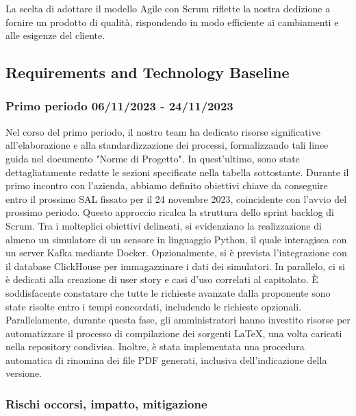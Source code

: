 \documentclass{article}
\begin{document}
La scelta di adottare il modello Agile con Scrum riflette la nostra dedizione a fornire un prodotto di qualità, rispondendo in modo efficiente ai cambiamenti e alle esigenze del cliente.


\subsection{Requirements and Technology Baseline}
\subsubsection{Primo periodo  06/11/2023 - 24/11/2023}
Nel corso del primo periodo, il nostro team ha dedicato risorse significative all'elaborazione e alla standardizzazione dei processi, formalizzando tali linee guida nel documento "Norme di Progetto". In quest'ultimo, sono state dettagliatamente redatte le sezioni specificate nella tabella sottostante.
Durante il primo incontro con l'azienda, abbiamo definito obiettivi chiave da conseguire entro il prossimo SAL fissato per il 24 novembre 2023, coincidente con l'avvio del prossimo periodo. Questo approccio ricalca la struttura dello sprint backlog di Scrum.
Tra i molteplici obiettivi delineati, si evidenziano la realizzazione di almeno un simulatore di un sensore in linguaggio Python, il quale interagisca con un server Kafka mediante Docker. Opzionalmente, si è prevista l'integrazione con il database ClickHouse per immagazzinare i dati dei simulatori. In parallelo, ci si è dedicati alla creazione di user story e casi d'uso correlati al capitolato.
È soddisfacente constatare che tutte le richieste avanzate dalla proponente sono state risolte entro i tempi concordati, includendo le richieste opzionali.
Parallelamente, durante questa fase, gli amministratori hanno investito risorse per automatizzare il processo di compilazione dei sorgenti LaTeX, una volta caricati nella repository condivisa. Inoltre, è stata implementata una procedura automatica di rinomina dei file PDF generati, inclusiva dell'indicazione della versione.

\subsubsection*{Rischi occorsi, impatto, mitigazione}
\end{document}
